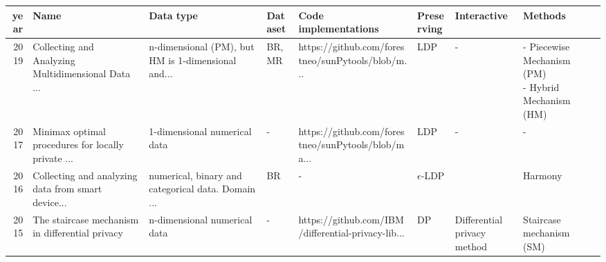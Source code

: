 \begin{landscape}
\begin{table}[ht]
\begin{adjustbox}{width=1.6\textwidth}
      \begin{tabular}{rllllllll}
        \toprule
        year                                & Name                                               & Data type                                          & Dataset & Code implementations                               & Preserving     & Interactive                 & Methods                                \\
        \midrule
        2019 \citep{wang_collecting_2019}   & Collecting and Analyzing Multidimensional Data ... & n-dimensional (PM), but HM is 1-dimensional and... & BR, MR  & https://github.com/forestneo/sunPytools/blob/m...  & LDP            & -                           & \shortstack{- Piecewise Mechanism (PM) \\- Hybrid Mechanism (HM)}                         \\
        2017 \citep{duchi_minimax_2017}     & Minimax optimal procedures for locally private ... & 1-dimensional numerical data                       & -       & https://github.com/forestneo/sunPytools/blob/ma... & LDP            & -                           & -                                      \\
        2016 \citep{nguyen_collecting_2016} & Collecting and analyzing data from smart device... & numerical, binary and categorical data. Domain ... & BR      & -                                                  & $\epsilon$-LDP &                             & Harmony                                \\
        2015 \citep{geng_staircase_2015}    & The staircase mechanism in differential privacy    & n-dimensional numerical data                       & -       & https://github.com/IBM/differential-privacy-lib... & DP             & Differential privacy method & Staircase mechanism (SM)               \\

\end{tabular}
\end{adjustbox}
\end{table}
\end{landscape}

